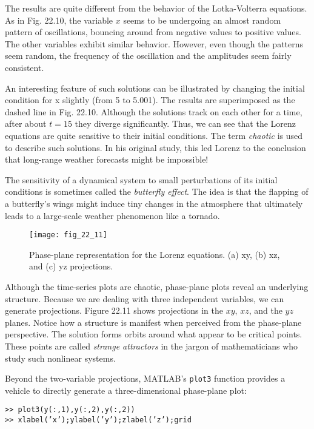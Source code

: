 The results are quite different from the behavior of the Lotka-Volterra equations. As in
Fig. 22.10, the variable $x$ seems to be undergoing an almost random pattern of oscillations,
bouncing around from negative values to positive values. The other variables exhibit
similar behavior. However, even though the patterns seem random, the frequency of the
oscillation and the amplitudes seem fairly consistent.

An interesting feature of such solutions can be illustrated by changing the initial condition for x slightly (from 5 to 5.001). The results are superimposed as the dashed line in
Fig. 22.10. Although the solutions track on each other for a time, after about $t = 15$ they
diverge significantly. Thus, we can see that the Lorenz equations are quite sensitive to
their initial conditions. The term \textit{chaotic} is used to describe such solutions. In his original study, this led Lorenz to the conclusion that long-range weather forecasts might be
impossible!

The sensitivity of a dynamical system to small perturbations of its initial conditions is
sometimes called the \textit{butterfly effect}. The idea is that the flapping of a butterfly's wings
might induce tiny changes in the atmosphere that ultimately leads to a large-scale weather
phenomenon like a tornado.

\begin{figure}[H]
    \centering
    \texttt{[image: fig\_22\_11]}
   \caption{\textsf{Phase-plane representation for the Lorenz equations. (a) xy, (b) xz, and (c) yz projections.}}\label{fig:fig_22_11}
\end{figure}

Although the time-series plots are chaotic, phase-plane plots reveal an underlying
structure. Because we are dealing with three independent variables, we can generate
projections. Figure 22.11 shows projections in the $xy$, $xz$, and the $yz$ planes. Notice how a
structure is manifest when perceived from the phase-plane perspective. The solution forms
orbits around what appear to be critical points. These points are called \textit{strange attractors} in
the jargon of mathematicians who study such nonlinear systems.

Beyond the two-variable projections, MATLAB's \texttt{plot3} function provides a vehicle
to directly generate a three-dimensional phase-plane plot:\vspace{\medskipamount}

\noindent\texttt{>> plot3(y(:,1),y(:,2),y(:,2))\\
>> xlabel('x');ylabel('y');zlabel('z');grid}\vspace{\medskipamount}

